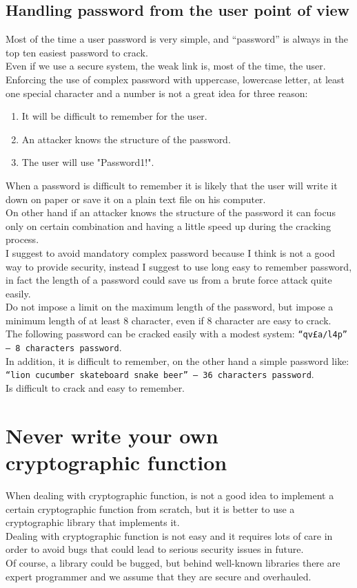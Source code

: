 \subsection{Handling password from the user point of view}
Most of the time a user password is very simple, and “password” is always in the top ten easiest password to crack.\\
Even if we use a secure system, the weak link is, most of the time, the user.\\
Enforcing the use of complex password with uppercase, lowercase letter, at least one special character and a number is not a great idea for three reason:
\begin{enumerate}
	\item It will be difficult to remember for the user.
	\item An attacker knows the structure of the password.
	\item The user will use "Password1!".
\end{enumerate}

When a password is difficult to remember it is likely that the user will write it down on paper or save it on a plain text file on his computer.\\
On other hand if an attacker knows the structure of the password it can focus only on certain combination and having a little speed up during the cracking process.\\

I suggest to avoid mandatory complex password because I think is not a good way to provide security, instead I suggest to use long easy to remember password, in fact the length of a password could save us from a brute force attack quite easily.\\
Do not impose a limit on the maximum length of the password, but impose a minimum length of at least 8 character, even if 8 character are easy to crack.\\
The following password can be cracked easily with a modest system:
\texttt{“qv£a/l4p” – 8 characters password}.\\
In addition, it is difficult to remember, on the other hand a simple password like:
\texttt{“lion cucumber skateboard snake beer” – 36 characters password}.\\
Is difficult to crack and easy to remember.

\section{Never write your own cryptographic function}
When dealing with cryptographic function, is not a good idea to implement a certain cryptographic function from scratch, but it is better to use a cryptographic library that implements it.\\
Dealing with cryptographic function is not easy and it requires lots of care in order to avoid bugs that could lead to serious security issues in future.\\
Of course, a library could be bugged, but behind well-known libraries there are expert programmer and we assume that they are secure and overhauled.\\

